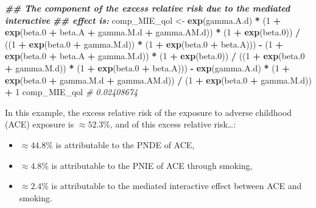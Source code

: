 \documentclass[
]{book}
\newenvironment{Shaded}{\begin{snugshade}}{\end{snugshade}}
\newcommand{\CommentTok}[1]{\textcolor[rgb]{0.56,0.35,0.01}{\textit{#1}}}
\newcommand{\DecValTok}[1]{\textcolor[rgb]{0.00,0.00,0.81}{#1}}
\newcommand{\DocumentationTok}[1]{\textcolor[rgb]{0.56,0.35,0.01}{\textbf{\textit{#1}}}}
\newcommand{\FloatTok}[1]{\textcolor[rgb]{0.00,0.00,0.81}{#1}}
\newcommand{\FunctionTok}[1]{\textcolor[rgb]{0.13,0.29,0.53}{\textbf{#1}}}
\newcommand{\NormalTok}[1]{#1}
\newcommand{\OtherTok}[1]{\textcolor[rgb]{0.56,0.35,0.01}{#1}}
\newcommand{\SpecialCharTok}[1]{\textcolor[rgb]{0.81,0.36,0.00}{\textbf{#1}}}
\providecommand{\tightlist}{%
  \setlength{\itemsep}{0pt}\setlength{\parskip}{0pt}}
\begin{document}
\begin{Shaded}
\begin{Highlighting}[]
\DocumentationTok{\#\# The component of the excess relative risk due to the mediated interactive}
\DocumentationTok{\#\# effect is:}
\NormalTok{comp\_MIE\_qol }\OtherTok{\textless{}{-}} \FunctionTok{exp}\NormalTok{(gamma.A.d) }\SpecialCharTok{*}
\NormalTok{  (}\DecValTok{1} \SpecialCharTok{+} \FunctionTok{exp}\NormalTok{(beta}\FloatTok{.0} \SpecialCharTok{+}\NormalTok{ beta.A }\SpecialCharTok{+}\NormalTok{ gamma.M.d }\SpecialCharTok{+}\NormalTok{ gamma.AM.d)) }\SpecialCharTok{*}\NormalTok{ (}\DecValTok{1} \SpecialCharTok{+} \FunctionTok{exp}\NormalTok{(beta}\FloatTok{.0}\NormalTok{)) }\SpecialCharTok{/}
\NormalTok{  ((}\DecValTok{1} \SpecialCharTok{+} \FunctionTok{exp}\NormalTok{(beta}\FloatTok{.0} \SpecialCharTok{+}\NormalTok{ gamma.M.d)) }\SpecialCharTok{*}\NormalTok{ (}\DecValTok{1} \SpecialCharTok{+} \FunctionTok{exp}\NormalTok{(beta}\FloatTok{.0} \SpecialCharTok{+}\NormalTok{ beta.A))) }\SpecialCharTok{{-}}
\NormalTok{  (}\DecValTok{1} \SpecialCharTok{+} \FunctionTok{exp}\NormalTok{(beta}\FloatTok{.0} \SpecialCharTok{+}\NormalTok{ beta.A }\SpecialCharTok{+}\NormalTok{ gamma.M.d)) }\SpecialCharTok{*}\NormalTok{ (}\DecValTok{1} \SpecialCharTok{+} \FunctionTok{exp}\NormalTok{(beta}\FloatTok{.0}\NormalTok{)) }\SpecialCharTok{/}
\NormalTok{  ((}\DecValTok{1} \SpecialCharTok{+} \FunctionTok{exp}\NormalTok{(beta}\FloatTok{.0} \SpecialCharTok{+}\NormalTok{ gamma.M.d)) }\SpecialCharTok{*}\NormalTok{ (}\DecValTok{1} \SpecialCharTok{+} \FunctionTok{exp}\NormalTok{(beta}\FloatTok{.0} \SpecialCharTok{+}\NormalTok{ beta.A))) }\SpecialCharTok{{-}}
  \FunctionTok{exp}\NormalTok{(gamma.A.d) }\SpecialCharTok{*}\NormalTok{ (}\DecValTok{1} \SpecialCharTok{+} \FunctionTok{exp}\NormalTok{(beta}\FloatTok{.0} \SpecialCharTok{+}\NormalTok{ gamma.M.d }\SpecialCharTok{+}\NormalTok{ gamma.AM.d)) }\SpecialCharTok{/}
\NormalTok{  (}\DecValTok{1} \SpecialCharTok{+} \FunctionTok{exp}\NormalTok{(beta}\FloatTok{.0} \SpecialCharTok{+}\NormalTok{ gamma.M.d)) }\SpecialCharTok{+} \DecValTok{1}
\NormalTok{comp\_MIE\_qol}
\CommentTok{\# 0.02408674}
\end{Highlighting}
\end{Shaded}

In this example, the excess relative risk of the exposure to adverse childhood (ACE) exposure is \(\approx 52.3\%\), and of this excess relative risk\ldots:

\begin{itemize}
\tightlist
\item
  \(\approx 44.8\%\) is attributable to the PNDE of ACE,
\item
  \(\approx 4.8\%\) is attributable to the PNIE of ACE through smoking,
\item
  \(\approx 2.4\%\) is attributable to the mediated interactive effect between ACE and smoking.
\end{itemize}
\end{document}
